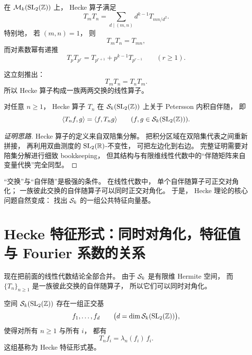 \begin{proposition}[Hecke 关系] 在 $\mathcal{M}_k(\mathrm{SL}_2(\mathbb{Z}))$ 上， Hecke 算子满足 \[ T_mT_n=\sum_{d\mid(m,n)} d^{k-1}T_{mn/d^2}. \] 特别地， 若 $(m,n)=1$， 则 \[ T_mT_n=T_{mn}, \] 而对素数幂有递推 \[ T_pT_{p^r}=T_{p^{r+1}}+p^{k-1}T_{p^{r-1}} \qquad (r\ge1). \] \end{proposition} 这立刻推出： \[ T_mT_n=T_nT_m. \] 所以 Hecke 算子构成一族两两交换的线性算子。




\begin{theorem}[自伴随性] 对任意 $n\ge1$， Hecke 算子 $T_n$ 在 $\mathcal{S}_k(\mathrm{SL}_2(\mathbb{Z}))$ 上关于 Petersson 内积自伴随， 即 \[ \langle T_n f, g \rangle=\langle f, T_n g \rangle \qquad (f,g\in \mathcal{S}_k(\mathrm{SL}_2(\mathbb{Z}))). \] \end{theorem}




\begin{proof}[证明思路] Hecke 算子的定义来自双陪集分解。 把积分区域在双陪集代表之间重新拼接， 再利用双曲测度的 $\mathrm{SL}_2(\mathbb{R})$-不变性， 可把左边化到右边。 完整证明需要对陪集分解进行细致 bookkeeping， 但其结构与有限维线性代数中的“伴随矩阵来自变量代换”完全同型。 \end{proof}




\begin{remark} “交换”与“自伴随”是极强的条件。 在线性代数中， 单个自伴随算子可正交对角化； 一族彼此交换的自伴随算子可以同时正交对角化。 于是， Hecke 理论的核心问题自然变成： 找出 $\mathcal{S}_k$ 的一组公共特征向量基。 \end{remark}




\section{Hecke 特征形式：同时对角化，特征值与 Fourier 系数的关系}




现在把前面的线性代数结论全部合并。 由于 $\mathcal{S}_k$ 是有限维 Hermite 空间， 而 $\{T_n\}_{n\ge1}$ 是一族彼此交换的自伴随算子， 所以它们可以同时对角化。




\begin{theorem}[同时对角化] 空间 $\mathcal{S}_k(\mathrm{SL}_2(\mathbb{Z}))$ 存在一组正交基 \[ f_1,\dots,f_d \qquad \bigl(d=\dim \mathcal{S}_k(\mathrm{SL}_2(\mathbb{Z}))\bigr), \] 使得对所有 $n\ge1$ 与所有 $i$， 都有 \[ T_n f_i=\lambda_n(f_i)\,f_i. \] 这组基称为 Hecke 特征形式基。 \end{theorem}




